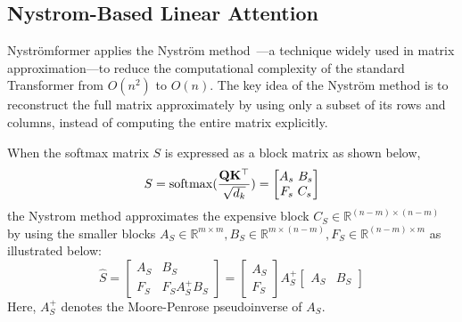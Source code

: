 \documentclass[letterpaper,twocolumn,10pt]{article}
\begin{document}
\subsection{Nystrom-Based Linear Attention}
Nyströmformer applies the Nyström method~\cite{}—a technique widely used in matrix approximation—to reduce the computational complexity of the standard Transformer from $O(n^2)$ to $O(n)$. The key idea of the Nyström method is to reconstruct the full matrix approximately by using only a subset of its rows and columns, instead of computing the entire matrix explicitly.

When the softmax matrix $S$ is expressed as a block matrix as shown below, 
\[
    S = {\mathrm{softmax}}(\frac{{\mathbf{Q}}{\mathbf{K}}^\top}{\sqrt{d_k}}) = \begin{bmatrix} A_s\ B_s \\ F_s\ C_s \end{bmatrix}  
\]
the Nystrom method approximates the expensive block $C_S \in \mathbb{R}^{(n-m)\times (n-m)}$ by using the smaller blocks $A_S \in \mathbb{R}^{m \times m}, B_S \in \mathbb{R}^{m \times (n-m)}, F_S \in \mathbb{R}^{(n-m)\times m}$ as illustrated below:
\[
    \hat S = \begin{bmatrix}
            A_S & B_S \\
            F_S & F_S A_S^{+} B_S
            \end{bmatrix} =
            \begin{bmatrix}
            A_S \\
            F_S
            \end{bmatrix}
            A_S^{+}
            \begin{bmatrix}
            A_S & B_S
            \end{bmatrix}
\]
Here, $A_S^+$ denotes the Moore-Penrose pseudoinverse of $A_S$.
\end{document}
